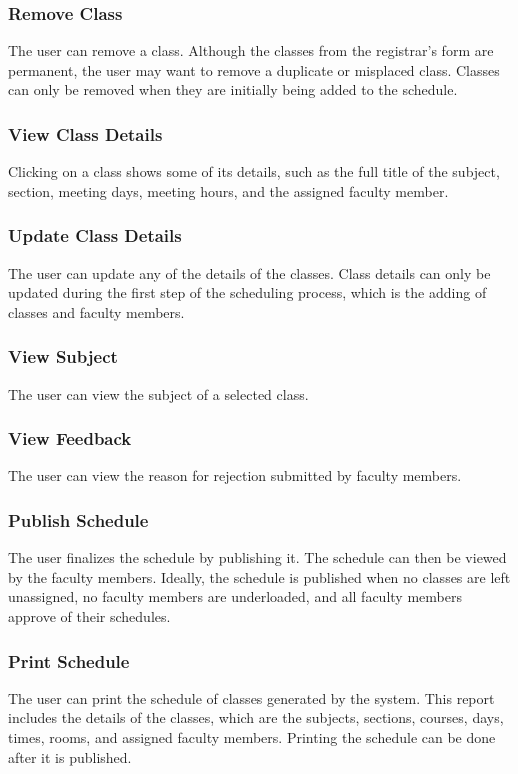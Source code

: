         \subsubsection{Remove Class}
        The user can remove a class. Although the classes from the registrar's form are permanent, the user may want to remove a duplicate or misplaced class. Classes can only be removed when they are initially being added to the schedule.
        
        \subsubsection{View Class Details}
        Clicking on a class shows some of its details, such as the full title of the subject, section, meeting days, meeting hours, and the assigned faculty member.
        
        \subsubsection{Update Class Details}
        The user can update any of the details of the classes. Class details can only be updated during the first step of the scheduling process, which is the adding of classes and faculty members.
        
        \subsubsection{View Subject}
        The user can view the subject of a selected class.
        
        \subsubsection{View Feedback}
        The user can view the reason for rejection submitted by faculty members.
        
        \subsubsection{Publish Schedule}
        The user finalizes the schedule by publishing it. The schedule can then be viewed by the faculty members. Ideally, the schedule is published when no classes are left unassigned, no faculty members are underloaded, and all faculty members approve of their schedules.
        
        \subsubsection{Print Schedule}
        The user can print the schedule of classes generated by the system. This report includes the details of the classes, which are the subjects, sections, courses, days, times, rooms, and assigned faculty members. Printing the schedule can be done after it is published.
        
